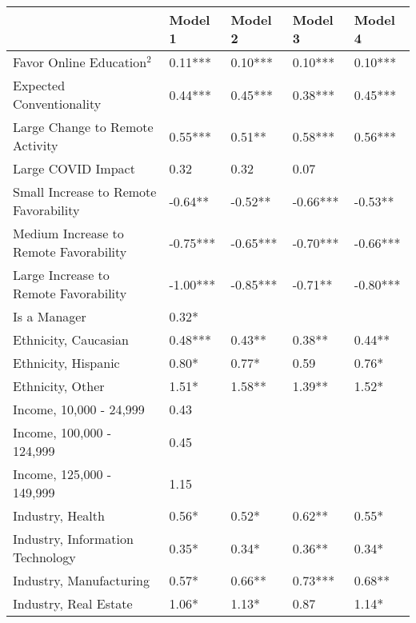 {
\def\sym#1{\ifmmode^{#1}\else\(^{#1}\)\fi}
\begin{tabular}{lllll}
    \hline
                                           & Model 1  & Model 2  & Model 3  & Model 4  \\
    \hline
    Favor Online Education$^2$             & 0.11***  & 0.10***  & 0.10***  & 0.10***  \\
    Expected Conventionality               & 0.44***  & 0.45***  & 0.38***  & 0.45***  \\
    Large Change to Remote Activity        & 0.55***  & 0.51**   & 0.58***  & 0.56***  \\
    Large COVID Impact                     & 0.32     & 0.32     & 0.07     &          \\
    Small Increase to Remote Favorability  & -0.64**  & -0.52**  & -0.66*** & -0.53**  \\
    Medium Increase to Remote Favorability & -0.75*** & -0.65*** & -0.70*** & -0.66*** \\
    Large Increase to Remote Favorability  & -1.00*** & -0.85*** & -0.71**  & -0.80*** \\
    Is a Manager                           & 0.32*    &          &          &          \\
    Ethnicity, Caucasian                   & 0.48***  & 0.43**   & 0.38**   & 0.44**   \\
    Ethnicity, Hispanic                    & 0.80*    & 0.77*    & 0.59     & 0.76*    \\
    Ethnicity, Other                       & 1.51*    & 1.58**   & 1.39**   & 1.52*    \\
    Income, 10,000 - 24,999                & 0.43     &          &          &          \\
    Income, 100,000 - 124,999              & 0.45     &          &          &          \\
    Income, 125,000 - 149,999              & 1.15     &          &          &          \\
    Industry, Health                       & 0.56*    & 0.52*    & 0.62**   & 0.55*    \\
    Industry, Information Technology       & 0.35*    & 0.34*    & 0.36**   & 0.34*    \\
    Industry, Manufacturing                & 0.57*    & 0.66**   & 0.73***  & 0.68**   \\
    Industry, Real Estate                  & 1.06*    & 1.13*    & 0.87     & 1.14*    \\

\end{tabular}}
